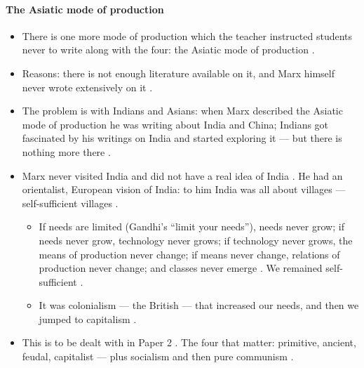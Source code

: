 \paragraph{The Asiatic mode of production}
\begin{itemize}
    \item There is one more mode of production which the teacher instructed students never to write along with the four: the Asiatic mode of production .
    \item Reasons: there is not enough literature available on it, and Marx himself never wrote extensively on it .
    \item The problem is with Indians and Asians: when Marx described the Asiatic mode of production he was writing about India and China; Indians got fascinated by his writings on India and started exploring it --- but there is nothing more there .
    \item Marx never visited India and did not have a real idea of India . He had an orientalist, European vision of India: to him India was all about villages --- self-sufficient villages .
    \begin{itemize}
        \item If needs are limited (Gandhi's ``limit your needs''), needs never grow; if needs never grow, technology never grows; if technology never grows, the means of production never change; if means never change, relations of production never change; and classes never emerge . We remained self-sufficient .
        \item It was colonialism --- the British --- that increased our needs, and then we jumped to capitalism .
    \end{itemize}
    \item This is to be dealt with in Paper 2 . The four that matter: primitive, ancient, feudal, capitalist --- plus socialism and then pure communism .
\end{itemize}

